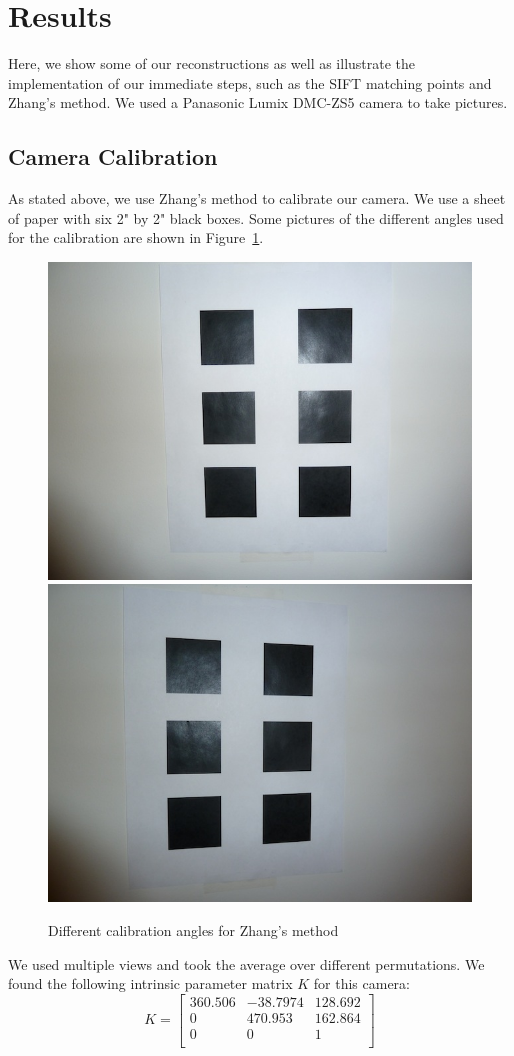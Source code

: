 \section{Results}
\label{s:results}

Here, we show some of our reconstructions as well as illustrate the implementation of our immediate steps, such as the SIFT matching points and Zhang's method. We used a Panasonic Lumix DMC-ZS5 camera to take pictures.

\subsection{Camera Calibration}
As stated above, we use Zhang's method to calibrate our camera. We use a sheet of paper with six 2" by 2" black boxes. Some pictures of the different angles used for the calibration are shown in Figure~\ref{calib_pics}. 

\begin{figure}[H]
\begin{center}
\includegraphics[width=0.45\linewidth]{figures/calib1.jpg}
\includegraphics[width=0.45\linewidth]{figures/calib2.jpg}
\end{center}
\caption{Different calibration angles for Zhang's method}
\label{calib_pics}
\end{figure}

We used multiple views and took the average over different permutations. We found the following intrinsic parameter matrix $K$ for this camera:
\begin{equation*}
K =
  \left[ {\begin{array}{ccc}
   360.506 & -38.7974 & 128.692  \\
  0 & 470.953 & 162.864 \\
   0 & 0 & 1 \\
  \end{array} } \right]
\end{equation*}

